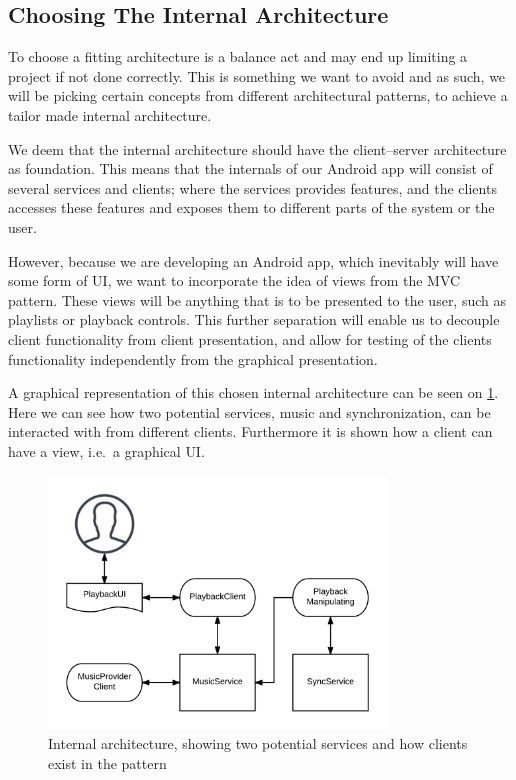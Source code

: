 \subsection{Choosing The Internal Architecture}
To choose a fitting architecture is a balance act and may end up limiting a project if not done correctly.
This is something we want to avoid and as such, we will be picking certain concepts from different architectural patterns, to achieve a tailor made internal architecture.

We deem that the internal architecture should have the client--server architecture as foundation.
This means that the internals of our Android app will consist of several services and clients;
where the services provides features, and the clients accesses these features and exposes them to different parts of the system or the user.

However, because we are developing an Android app, which inevitably will have some form of \ac{UI}, we want to incorporate the idea of views from the \ac{MVC} pattern.
These views will be anything that is to be presented to the user, such as playlists or playback controls.
This further separation will enable us to decouple client functionality from client presentation, and allow for testing of the clients functionality independently from the graphical presentation.

A graphical representation of this chosen internal architecture can be seen on \cref{fig:internal_architecture}.
Here we can see how two potential services, music and synchronization, can be interacted with from different clients.
Furthermore it is shown how a client can have a view, i.e.~a graphical \ac{UI}.

\begin{figure}
    \footnotesize
    \centering
    \includegraphics[width=0.8\textwidth]{img/internal_architecture.png}
    \caption{Internal architecture, showing two potential services and how clients exist in the pattern}\label{fig:internal_architecture}
\end{figure}
